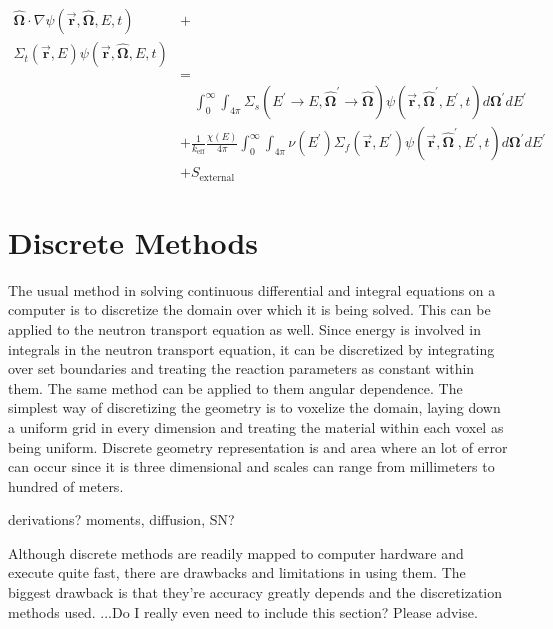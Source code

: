 \begin{equation}
\label{time_ind_NTE}
\begin{split}
\boldsymbol{\hat{\Omega}}  \cdot \nabla \psi(\boldsymbol{\vec{r}},\boldsymbol{\hat{\Omega}},E,t) &+ \\
\Sigma_t(\boldsymbol{\vec{r}},E) \psi(\boldsymbol{\vec{r}},\boldsymbol{\hat{\Omega}},E,t) & \\
& =  \\
& \quad \int_0^\infty  \int_{4\pi} \Sigma_s(E^\prime \rightarrow E,\boldsymbol{\hat{\Omega}}^\prime \rightarrow \boldsymbol{\hat{\Omega}}) \psi(\boldsymbol{\vec{r}},\boldsymbol{\hat{\Omega}}^\prime,E^\prime,t) d\boldsymbol{\Omega}^\prime dE^\prime  \\
&+ \frac{1}{k_{\mathrm{eff}}}\frac{\chi(E)}{4\pi} \int_0^\infty  \int_{4\pi}   \nu(E^\prime) \Sigma_f(\boldsymbol{\vec{r}},E^\prime) \psi(\boldsymbol{\vec{r}},\boldsymbol{\hat{\Omega}}^\prime,E^\prime,t) d\boldsymbol{\Omega}^\prime  dE^\prime\\
& + S_{\mathrm{external}}
\end{split}
 \end{equation}
 

\section{Discrete Methods}

The usual method in solving continuous differential and integral equations on a computer is to discretize the domain over which it is being solved.  This can be applied to the neutron transport equation as well.  Since energy is involved in integrals in the neutron transport equation, it can be discretized by integrating over set boundaries and treating the reaction parameters as constant within them.  The same method can be applied to them angular dependence.   The simplest way of discretizing the geometry is to voxelize the domain, laying down a uniform grid in every dimension and treating the material within each voxel as being uniform.  Discrete geometry representation is and area where an lot of error can occur since it is three dimensional and scales can range from millimeters to hundred of meters. 

derivations?  moments, diffusion, SN?

Although discrete methods are readily mapped to computer hardware and execute quite fast, there are drawbacks and limitations in using them.  The biggest drawback is that they're accuracy greatly depends and the discretization methods used.  ...Do I really even need to include this section?  Please advise.

